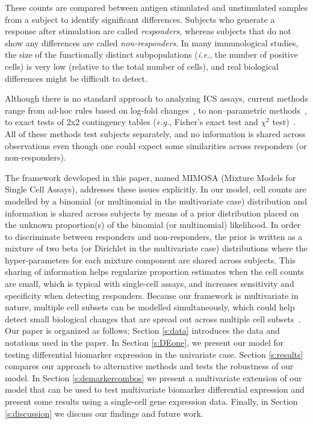 \documentclass[12pt,oupdraft]{biostatistics}
\begin{document}
These counts are compared between antigen stimulated and unstimulated samples from a subject to identify significant differences. Subjects who generate a response after stimulation are called \textit{responders}, whereas subjects that do not show any differences are called \textit{non-responders}.
In many immunological studies, the size of the functionally distinct subpopulations (\textit{i.e.}, the number of positive cells) is very low (relative to the total number of cells), and real biological differences might be difficult to detect.

Although there is no standard approach to analyzing ICS assays, current methods range from ad-hoc rules based on log-fold changes~\citep{Trigona:2003}, to non--parametric methods~\citep{Sinclair:2004hs}, to exact tests of 2x2 contingency tables (\textit{e.g.}, Fisher's exact test and $\chi^2$ test)~\citep{Horton:2007tsa,Proschan:2009ks,Peiperl:2010ej,Nason:2006dx}.
All of these methods test subjects separately, and no information is shared across observations even though one could expect some similarities across responders (or non-responders).

The framework developed in this paper, named MIMOSA (Mixture Models for Single Cell Assays), addresses these issues explicitly. In our model, cell counts are modelled by a binomial (or multinomial in the multivariate case) distribution and information is shared across subjects by means of a prior distribution placed on the unknown proportion(s) of the binomial (or multinomial) likelihood.
In order to discriminate between responders and non-responders, the prior is written as a mixture of two beta (or Dirichlet in the multivariate case) distributions where the hyper-parameters for each mixture component are shared across subjects.
This sharing of information helps regularize proportion estimates when the cell counts are small, which is typical with single-cell assays, and increases sensitivity and specificity when detecting responders.
Because our framework is multivariate in nature, multiple cell subsets can be modelled simultaneously, which could help detect small biological changes that are spread out across multiple cell subsets~\citep{Nason:2006dx}. Our paper is organized as follows; Section \ref{s:data} introduces the data and notations used in the paper. In Section \ref{s:DEone}, we present our model for testing differential biomarker expression in the univariate case. Section \ref{s:results} compares our approach to alternative methods and tests the robustness of our model. In Section \ref{s:demarkercombos} we present a multivariate extension of our model that can be used to test multivariate biomarker differential expression and present some results using a single-cell gene expression data. Finally, in Section \ref{s:discussion} we discuss our findings and future work.
\end{document}
